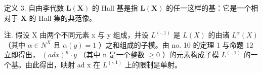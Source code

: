 定义 3. 自由李代数 \(\mathbf{L}(\mathbf{X})\) 的 Hall 基是指 \(\mathbf{L}(\mathbf{X})\) 的任一这样的基：它是一个相对于 \(\mathbf{X}\) 的 Hall 集的典范像。

注. 假设 X 由两个不同元素 x 与 y 组成，并设 \(L^{(\cdot,1)}\) 是 \(L(X)\) 的由诸 \(L^{\alpha}(X)\) （其中 \(\alpha\in N^{X}\) 且 \(\alpha(y)=1\) ）之和组成的子模。由 no. 10 的定理 1 与命题 12 立即得出， \((ad x)^{n}\cdot y\) （其中 n 是一个整数 \(\geqslant0\) ）的元素构成子模 \(L^{(\cdot,1)}\) 的一个基。由此得出，映射 ad x 在 \(L^{(\cdot,1)}\) 上的限制是单射。

